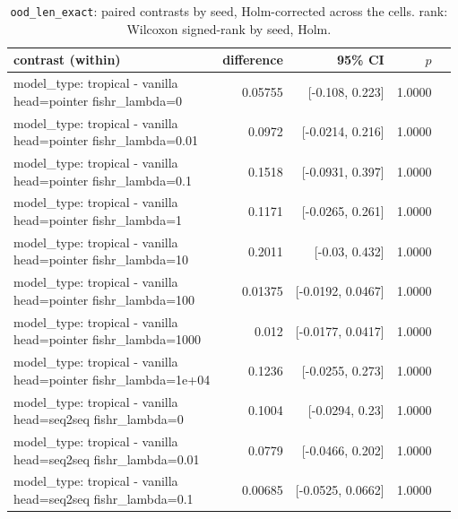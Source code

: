 \documentclass[10pt]{article}
\makeatletter
\newcommand{\stackcell}[1]{\begin{tabular}[t]{@{}l@{}}#1\end{tabular}}
\makeatother
\begin{document}
{\small
\begin{longtable}{lrrrl}
\caption{\texttt{ood\_len\_exact}: paired contrasts by seed, Holm-corrected across the cells. rank: Wilcoxon signed-rank by seed, Holm.}\label{tab:paired-ood_len_exact}\\
\toprule
contrast (within) & difference & 95\% CI & $p$ & \\
\midrule
\endhead
\stackcell{model\_type: tropical - vanilla\\\footnotesize head=pointer fishr\_lambda=0 } & 0.05755 & [-0.108, 0.223] & 1.0000 & \\
\stackcell{model\_type: tropical - vanilla\\\footnotesize head=pointer fishr\_lambda=0.01 } & 0.0972 & [-0.0214, 0.216] & 1.0000 & \\
\stackcell{model\_type: tropical - vanilla\\\footnotesize head=pointer fishr\_lambda=0.1 } & 0.1518 & [-0.0931, 0.397] & 1.0000 & \\
\stackcell{model\_type: tropical - vanilla\\\footnotesize head=pointer fishr\_lambda=1 } & 0.1171 & [-0.0265, 0.261] & 1.0000 & \\
\stackcell{model\_type: tropical - vanilla\\\footnotesize head=pointer fishr\_lambda=10 } & 0.2011 & [-0.03, 0.432] & 1.0000 & \\
\stackcell{model\_type: tropical - vanilla\\\footnotesize head=pointer fishr\_lambda=100 } & 0.01375 & [-0.0192, 0.0467] & 1.0000 & \\
\stackcell{model\_type: tropical - vanilla\\\footnotesize head=pointer fishr\_lambda=1000 } & 0.012 & [-0.0177, 0.0417] & 1.0000 & \\
\stackcell{model\_type: tropical - vanilla\\\footnotesize head=pointer fishr\_lambda=1e+04 } & 0.1236 & [-0.0255, 0.273] & 1.0000 & \\
\stackcell{model\_type: tropical - vanilla\\\footnotesize head=seq2seq fishr\_lambda=0 } & 0.1004 & [-0.0294, 0.23] & 1.0000 & \\
\stackcell{model\_type: tropical - vanilla\\\footnotesize head=seq2seq fishr\_lambda=0.01 } & 0.0779 & [-0.0466, 0.202] & 1.0000 & \\
\stackcell{model\_type: tropical - vanilla\\\footnotesize head=seq2seq fishr\_lambda=0.1 } & 0.00685 & [-0.0525, 0.0662] & 1.0000 & \\

\end{longtable}}
\end{document}
